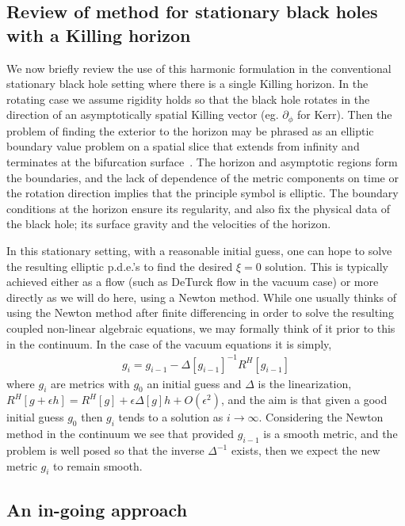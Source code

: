 \documentclass[12pt]{article}
\numberwithin{equation}{section}
\begin{document}
\subsection{Review of method for stationary black holes with a Killing horizon}

We now briefly review the use of this harmonic formulation in the conventional stationary black hole setting where there is a single Killing horizon. In the rotating case we assume rigidity holds so that the black hole rotates in the direction of an asymptotically spatial Killing vector (eg. $\partial_\phi$ for Kerr). Then the problem of finding the exterior to the horizon may be phrased as an elliptic boundary value problem on a spatial slice that extends from infinity and terminates at the bifurcation surface~\cite{Adam:2011dn}. The horizon and asymptotic regions form the boundaries, and the lack of dependence of the metric components on time or the rotation direction implies that the principle symbol is elliptic. The boundary conditions at the horizon ensure its regularity, and also fix the physical data of the black hole; its surface gravity and the velocities of the horizon.

In this stationary setting, with a reasonable initial guess, one can hope to solve the resulting elliptic p.d.e.'s to find the desired $\xi = 0$ solution. This is typically achieved either as a flow (such as DeTurck flow in the vacuum case) or more directly as we will do here, using a Newton method. 
While one usually thinks of using the Newton method after finite differencing in order to solve the resulting coupled non-linear algebraic equations, we may formally think of it prior to this in the continuum. In the case of the vacuum equations it is simply,
\begin{eqnarray}
g_i = g_{i-1} - \Delta[g_{i-1}]^{-1} R^H[g_{i-1}]
\end{eqnarray}
where $g_i$ are metrics with $g_0$ an initial guess and $\Delta$ is the linearization, $R^H[g + \epsilon h] = R^H[g] + \epsilon \Delta[g] h + O(\epsilon^2)$, and the aim is that given a good initial guess $g_0$ then $g_i$ tends to a solution as $i \to \infty$.
Considering the Newton method in the continuum we see that provided $g_{i-1}$ is a smooth metric, and the problem is well posed so that the inverse $\Delta^{-1}$ exists, then we expect the new metric $g_i$ to remain smooth.


\subsection{An in-going approach}
\end{document}
